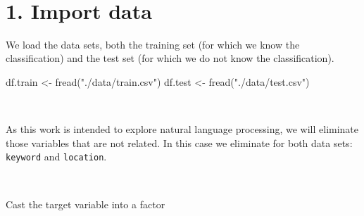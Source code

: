 \documentclass[
]{article}
\newenvironment{Shaded}{\begin{snugshade}}{\end{snugshade}}
\newcommand{\CommentTok}[1]{\textcolor[rgb]{0.56,0.35,0.01}{\textit{#1}}}
\newcommand{\ConstantTok}[1]{\textcolor[rgb]{0.00,0.00,0.00}{#1}}
\newcommand{\FunctionTok}[1]{\textcolor[rgb]{0.00,0.00,0.00}{#1}}
\newcommand{\NormalTok}[1]{#1}
\newcommand{\OtherTok}[1]{\textcolor[rgb]{0.56,0.35,0.01}{#1}}
\newcommand{\SpecialCharTok}[1]{\textcolor[rgb]{0.00,0.00,0.00}{#1}}
\newcommand{\StringTok}[1]{\textcolor[rgb]{0.31,0.60,0.02}{#1}}
\begin{document}
~

\hypertarget{import-data}{%
\section{1. Import data}\label{import-data}}

We load the data sets, both the training set (for which we know the
classification) and the test set (for which we do not know the
classification).

\begin{Shaded}
\begin{Highlighting}[]
\NormalTok{df.train }\OtherTok{\textless{}{-}} \FunctionTok{fread}\NormalTok{(}\StringTok{"./data/train.csv"}\NormalTok{)}
\NormalTok{df.test }\OtherTok{\textless{}{-}} \FunctionTok{fread}\NormalTok{(}\StringTok{"./data/test.csv"}\NormalTok{)}
\end{Highlighting}
\end{Shaded}

~

As this work is intended to explore natural language processing, we will
eliminate those variables that are not related. In this case we
eliminate for both data sets: \texttt{keyword} and \texttt{location}.

\begin{Shaded}
\end{Shaded}

~

Cast the target variable into a factor

\begin{Shaded}
\end{Shaded}
\end{document}
